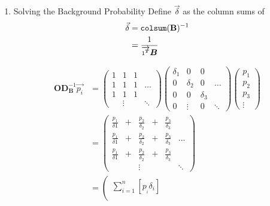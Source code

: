 \documentclass[11pt]{article}
\begin{document}
\begin{enumerate}
\item Solving the Background Probability
\label{sec:org4060b28}
Define \(\vec{\delta}\) as the column sums of
\[\begin{aligned}
     \vec{\delta} & = \mathtt{colsum} (\text{{\bfseries{B}}})^{- 1}\\
     & = \frac{1}{\overrightarrow{1^{{\scriptsize \ensuremath{\boldsymbol{T}}}}}
     \ensuremath{\boldsymbol{B}}}
   \end{aligned}\]



\begin{align}
     \mathbf{OD}_{\mathbf{B}}^{- 1} \overrightarrow{p_i} & = \left(
     \begin{array}{cccc}
       1 & 1 & 1 & \\
       1 & 1 & 1 & \ldots\\
       1 & 1 & 1 & \\
       & \vdots &  & \ddots
     \end{array} \right) \left( \begin{array}{cccc}
       \delta_1 & 0 & 0 & \\
       0 & \delta_2 & 0 & \ldots\\
       0 & 0 & \delta_3 & \\
       0 & \vdots & 0 & \ddots
     \end{array} \right) \left( \begin{array}{c}
       p_1\\
       p_2\\
       p_3\\
       \vdots
     \end{array} \right) \nonumber \nonumber \\
     & = \left( \begin{array}{cccccc}
       \frac{p_1}{\delta 1} & + & \frac{p_2}{\delta_2} & + &
       \frac{p_3}{\delta_3} & \\
       \frac{p_1}{\delta 1} & + & \frac{p_2}{\delta_2} & + &
       \frac{p_3}{\delta_3} & \ldots\\
       \frac{p_1}{\delta 1} & + & \frac{p_2}{\delta_2} & + &
       \frac{p_3}{\delta_3} & \\
       &  & \vdots &  &  & \ddots
     \end{array} \right) \nonumber \nonumber \\
     & = \left(\begin{array}{c}
       \sum^n_{i = 1} [p_{_i} \delta_i]\\

\end{array}
\end{align}
\end{enumerate}
\end{document}
